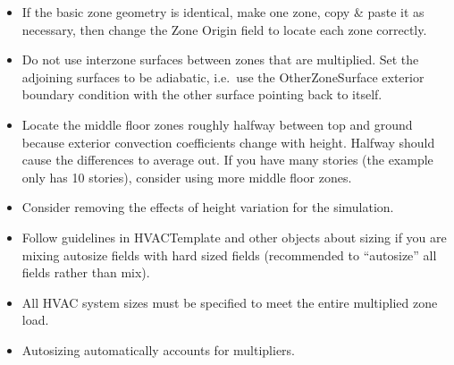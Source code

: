 \begin{itemize}
\item
  If the basic zone geometry is identical, make one zone, copy \& paste it as necessary, then change the Zone Origin field to locate each zone correctly.
\item
  Do not use interzone surfaces between zones that are multiplied. Set the adjoining surfaces to be adiabatic, i.e.~use the OtherZoneSurface exterior boundary condition with the other surface pointing back to itself.
\item
  Locate the middle floor zones roughly halfway between top and ground because exterior convection coefficients change with height. Halfway should cause the differences to average out. If you have many stories (the example only has 10 stories), consider using more middle floor zones.
\item
  Consider removing the effects of height variation for the simulation.
\item
  Follow guidelines in HVACTemplate and other objects about sizing if you are mixing autosize fields with hard sized fields (recommended to ``autosize'' all fields rather than mix).
\item
  All HVAC system sizes must be specified to meet the entire multiplied zone load.
\item
  Autosizing automatically accounts for multipliers.
\end{itemize}
